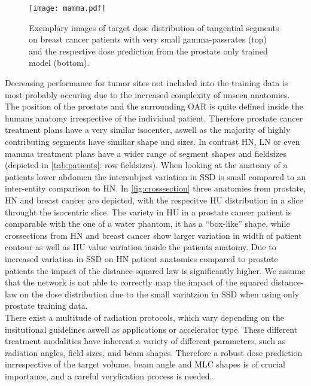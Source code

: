 \begin{figure}
    \centering
    \texttt{[image: mamma.pdf]}
    \caption{
        Exemplary images of target dose distribution of tangential segments on breast cancer patients with very small gamma-passrates (top) and the respective dose prediction from the prostate only trained model (bottom).}\label{fig:mamma}
\end{figure}

Decreasing performance for tumor sites not included into the training data is most probably occuring due to the increased complexity of unseen anatomies. 
The position of the prostate and the surrounding \acs{OAR} is quite defined inside the humans anatomy irrespective of the individual patient. 
Therefore prostate cancer treatment plans have a very similar isocenter, aswell as the majority of highly contributing segments have similiar shape and sizes.
In contrast \acs{HN}, \acs{LN} or even mamma treatment plans have a wider range of segment shapes and fieldsizes (depicted in \autoref{tab:patients}: row fieldsizes). 
When looking at the anatomy of a patients lower abdomen the intersubject variation in \acs{SSD} is small compared to an inter-entity comparison to \acs{HN}. 
In \autoref{fig:crosssection} three anatomies from prostate, \acs{HN} and breast cancer are depicted, with the respecitve \ac{HU} distribution in a slice throught the isocentric slice.
The variety in \acs{HU} in a prostate cancer patient is comparable with the one of a water phantom, it has a ``box-like'' shape, while crossections from \acs{HN} and breast cancer show larger variation in width of patient contour as well as \acs{HU} value variation inside the patients anatomy.
Due to increased variation in \acs{SSD} on \acs{HN} patient anatomies compared to prostate patients the impact of the distance-squared law is significantly higher.
We assume that the network is not able to correctly map the impact of the squared distance-law on the dose distribution due to the small variatzion in \acs{SSD} when using only prostate training data.\\
There exist a multitude of radiation protocols, which vary depending on the insitutional guidelines aswell as applications or accelerator type. 
These different treatment modalities have inherent a variety of different parameters, such as radiation angles, field sizes, and beam shapes.
Therefore a robust dose prediction inrrespective of the target volume, beam angle and \acs{MLC} shapes is of crucial importance, and a careful veryfication process is needed. 

